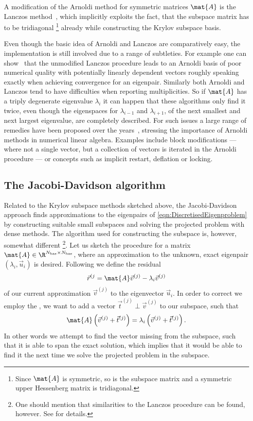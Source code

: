 A modification of the Arnoldi method for symmetric matrices $\mat{A}$
is the Lanczos method~\cite{Lanczos1950},
which implicitly exploits the fact,
that the subspace matrix has to be tridiagonal%
\footnote{Since $\mat{A}$ is symmetric, so is the subspace matrix
and a symmetric upper Hessenberg matrix is tridiagonal.}
already while constructing the Krylov subspace basis.

Even though the basic idea of Arnoldi and Lanczos are comparatively easy,
the implementation is still involved
due to a range of subtleties.
For example one can show~\cite{Arbenz2010} that the unmodified
Lanczos procedure
leads to an Arnoldi basis of poor numerical quality
with potentially linearly dependent vectors
roughly speaking
exactly when achieving convergence for an eigenpair.
Similarly both Arnoldi and Lanczos tend to have difficulties
when reporting multiplicities.
So if $\mat{A}$ has a triply degenerate eigenvalue $\lambda_i$
it can happen that these algorithms only find it twice,
even though the eigenspaces for $\lambda_{i-1}$
and $\lambda_{i+1}$,
\ie of the next smallest and next largest eigenvalue,
are completely described.
For such issues a large range of remedies have been proposed
over the years~\cite{Arbenz2010,Saad2003},
stressing the importance of Arnoldi methods in numerical linear algebra.
Examples include block modifications ---
where not a single vector, but a collection of vectors is iterated
in the Arnoldi procedure ---
or concepts such as implicit restart, deflation or locking.

\subsection{The Jacobi-Davidson algorithm}
\label{sec:Davidson}
Related to the Krylov subspace methods
sketched above, the Jacobi-Davidson approach
finds approximations to the eigenpairs of \eqref{eqn:DiscretisedEigenproblem}
by constructing suitable small subspaces
and solving the projected problem with dense methods.
The algorithm used for constructing the subspace is, however,
somewhat different%
\footnote{One should mention that similarities to the Lanczos procedure
	can be found, however. See \cite{Arbenz2010} for details.}.
Let us sketch the procedure for a matrix $\mat{A} \in \R^{\Nbas \times \Nbas}$,
where an approximation to the unknown, exact eigenpair $(\lambda_i, \vec{u}_i)$
is desired.
Following \citet{Davidson1975} we define the residual
\begin{equation}
	\vec{r}^{(j} = \mat{A} \vec{v}^{(j)} - \lambda_i \vec{v}^{(j)}
	\label{eqn:DavidsonResidual}
\end{equation}
of our current approximation $\vec{v}^{(j)}$ to the eigenvector $\vec{u}_i$.
In order to correct we employ the
,
\ie we want to add a vector $\vec{t}^{(j)} \perp \vec{v}^{(j)}$ to our
subspace, such that
\[
	\mat{A} \left(\vec{v}^{(j)} + \vec{t}^{(j)}\right) = \lambda_i \left(\vec{v}^{(j)} + \vec{t}^{(j)}\right).
\]
In other words we attempt to find the vector missing from the subspace,
such that it is able to span the exact solution,
which implies that it would be able to find it the next time
we solve the projected problem in the subspace.

